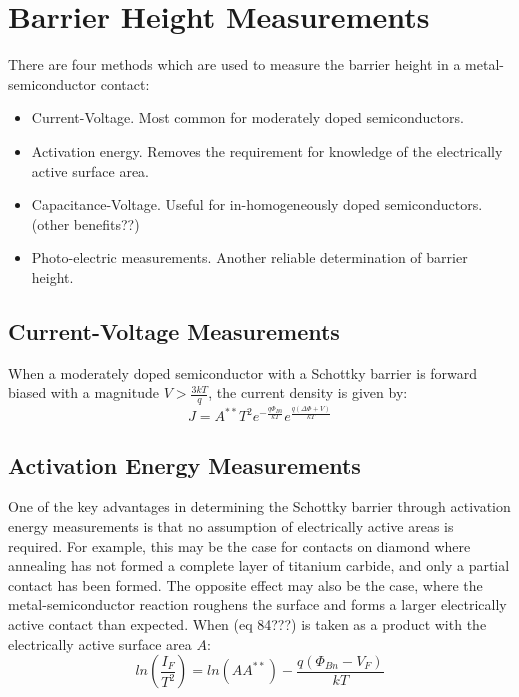 \section{Barrier Height Measurements}
\label{sec:barrier_height_measurements}
There are four methods which are used to measure the barrier height in a metal-semiconductor contact:
\begin{itemize}
	\item Current-Voltage. Most common for moderately doped semiconductors.
	\item Activation energy. Removes the requirement for knowledge of the electrically active surface area.
	\item Capacitance-Voltage. Useful for in-homogeneously doped semiconductors. (other benefits??)
	\item Photo-electric measurements. Another reliable determination of barrier height. 
\end{itemize}
\subsection{Current-Voltage Measurements}
When a moderately doped semiconductor with a Schottky barrier is forward biased with a magnitude $V>\frac{3kT}{q}$, the current density is given by:
\begin{equation}
	J = A^{**}T^{2}e^{-\frac{q\Phi_{B0}}{kT}}e^{\frac{q\left(\Delta\Phi+V\right)}{kT}}
\end{equation}
\subsection{Activation Energy Measurements}
One of the key advantages in determining the Schottky barrier through activation energy measurements is that no assumption of electrically active areas is required. For example, this may be the case for contacts on diamond where annealing has not formed a complete layer of titanium carbide, and only a partial contact has been formed. The opposite effect may also be the case, where the metal-semiconductor reaction roughens the surface and forms a larger electrically active contact than expected. When (eq 84???) is taken as a product with the electrically active surface area $A$:
\begin{equation}
	ln\left(\frac{I_{F}}{T^{2}}\right) = ln\left(AA^{**}\right)-\frac{q\left(\Phi_{Bn}-V_{F}\right)}{kT}
\end{equation}

